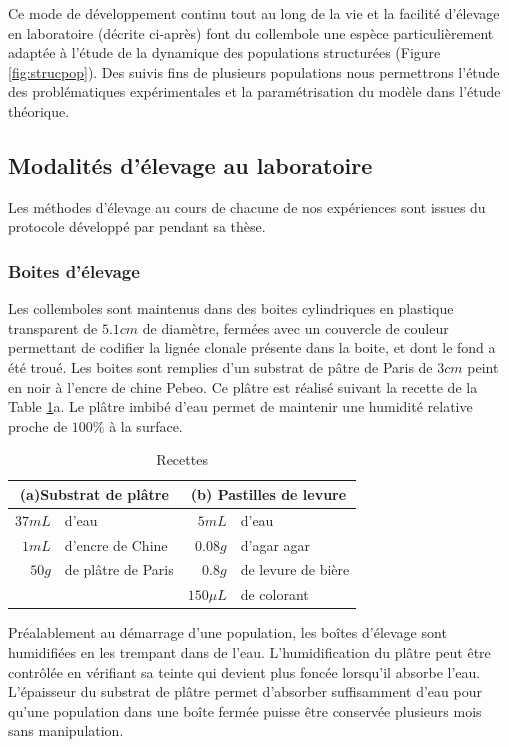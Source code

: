 Ce mode de développement continu tout au long de la vie et la facilité
d'élevage en laboratoire (décrite ci-après) font du collembole une espèce
particulièrement adaptée à l'étude de la dynamique des populations structurées
(Figure \ref{fig:strucpop}).
Des suivis fins de plusieurs populations nous permettrons l'étude des
problématiques expérimentales et la paramétrisation du modèle dans l'étude
théorique. 

\subsection{Modalités d'élevage au laboratoire}

Les méthodes d'élevage au cours de chacune de nos expériences sont issues du
protocole développé par \textcites{tully2004a} pendant sa thèse.

\subsubsection{Boites d'élevage}

Les collemboles sont maintenus dans des boites cylindriques en
plastique transparent de $5.1 cm$ de diamètre, fermées avec un couvercle de
couleur permettant de codifier la lignée clonale présente dans la boite, et dont
le fond a été troué. Les boites sont remplies d'un substrat de pâtre de Paris de
$3cm$ peint en noir à l'encre de chine Pebeo\textcopyright. Ce plâtre est
réalisé suivant la recette de la Table \ref{tab:recettes}a. Le plâtre imbibé
d'eau permet de maintenir une humidité relative proche de $100\%$ à la surface.

\begin{table}[!h]
\begin{center}
\begin{tabular}{rl|rl}
\multicolumn{2}{c}{(a)Substrat de plâtre}&\multicolumn{2}{c}{(b) Pastilles de levure}\\
\hline 
$37mL$ & d'eau & $5mL$ & d'eau\\ 
$1mL$ & d'encre de Chine & $0.08g$ & d'agar agar \\ 
$50g$ & de plâtre de Paris & $0.8g$ & de levure de bière\\
& & $150\mu L$ & de colorant\\ 
\end{tabular} 
\caption[Recettes]{\label{tab:recettes}Recettes}
\end{center}
\end{table}

Préalablement au démarrage d'une population, les boîtes d'élevage sont
humidifiées en les trempant dans de l'eau. L'humidification du plâtre peut être
contrôlée en vérifiant sa teinte qui devient plus foncée lorsqu'il absorbe
l'eau. L'épaisseur du substrat de plâtre permet d'absorber suffisamment d'eau
pour qu'une population dans une boîte fermée puisse être conservée plusieurs
mois sans manipulation.

